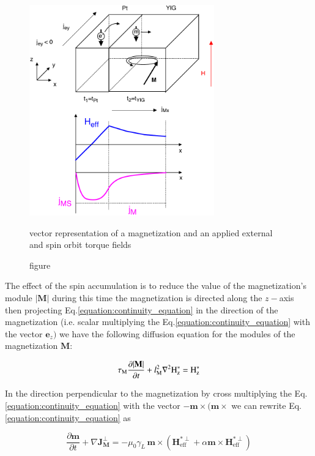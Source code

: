 \documentclass[review]{elsarticle}
\begin{document}
\begin{figure}
 \includegraphics[width=8cm]{scheme.pdf}
\caption{figure}{vector representation of a magnetization and an applied external and spin orbit torque fields}
\end{figure}

The effect of the spin accumulation is to reduce the value of the magnetization's module $|\mathbf{M}|$ during this time the magnetization is directed along the $z-$axis then projecting Eq.\ref{equation:continuity_equation} in the direction of the magnetization  (i.e.  scalar multiplying  the Eq.\ref{equation:continuity_equation} with the vector $\mathbf{e}_z)$ we have the following diffusion equation  for the modules of the magnetization $\mathbf{M}$: 


\begin{equation}
\tau_\mathrm{\tiny{M}}\frac{\partial \mathbf{|M|}}{\partial t} + l_\mathrm{\tiny{M}}^2 \nabla^2 \mathrm{H}_{\mathrm{\tiny{z}}}^*  = \mathrm{H}_{\mathrm{\tiny{z}}}^* 
\end{equation}

In the direction perpendicular to the magnetization by cross multiplying the Eq.\ref{equation:continuity_equation} with the vector $-\mathbf{m}\times(\mathbf{m}\times$ we can rewrite Eq.\ref{equation:continuity_equation} as

\begin{equation}
\label{EQ:d&p_t}
\frac{\partial  \mathbf{m}}{\partial  t} +\nabla\mathbf{J}^{\perp}_{\mathbf{M}}= -\mu_0\gamma_L \, \mathbf{m} \times \left( \mathbf{H}_\mathrm{eff}^{*\perp}+\alpha \mathbf{m} \times \mathbf{H}_\mathrm{eff}^{*\perp}\right)
\end{equation}
\end{document}
